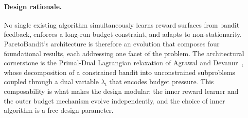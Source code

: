 \paragraph{Design rationale.}
No single existing algorithm simultaneously learns reward surfaces from bandit feedback, enforces a long-run budget constraint, and adapts to non-stationarity.
ParetoBandit's architecture is therefore an evolution that composes four foundational results, each addressing one facet of the problem.
The architectural cornerstone is the Primal-Dual Lagrangian relaxation of Agrawal and Devanur~\cite{agrawal2014bandits}, whose decomposition of a constrained bandit into unconstrained subproblems coupled through a dual variable $\lambda_t$ that encodes budget pressure.
This composability is what makes the design modular: the inner reward learner and the outer budget mechanism evolve independently, and the choice of inner algorithm is a free design parameter.

